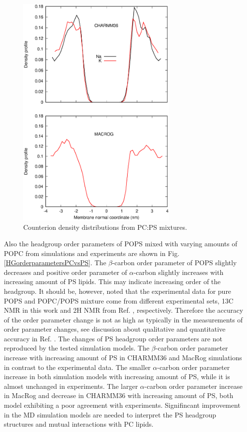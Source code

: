 \documentclass[aps,prl,superscriptaddress,twocolumn]{revtex4}
\begin{document}
\begin{figure}[]
  \centering
  \includegraphics[width=8.0cm]{../Figs/CIdensPSOCmixt.eps}
  \caption{  Counterion density distributions from PC:PS mixtures.
\label{CIdensPSOCmixt}
  }
\end{figure}

Also the headgroup order parameters of POPS mixed with varying amounts of POPC
from simulations and experiments \cite{borle85,roux90} are shown in Fig. \ref{HGorderparametersPCvsPS}.
The $\beta$-carbon order parameter of POPS slightly decreases and positive 
order parameter of $\alpha$-carbon slightly increases with increasing
amount of PS lipids. This may indicate increasing order of the headgroup.
It should be, however, noted that the experimental data for pure POPS and
POPC/POPS mixture come from different experimental sets, 13C NMR in this work
and 2H NMR from Ref. , respectively. Therefore the accuracy
of the order parameter change is not as high as typically in the measurements
of order parameter changes, see discussion about qualitative and quantitative 
accuracy in Ref. . The changes of PS headgroup order parameters
are not reproduced by the tested simulation models. The $\beta$-carbon order parameter
increase with increasing amount of PS in CHARMM36 and MacRog simulations in contrast
to the experimental data. The smaller $\alpha$-carbon order parameter increase in both
simulation models with increasing amount of PS, while it is almost unchanged in experiments.
The larger $\alpha$-carbon order parameter increase in MacRog and decrease in CHARMM36
with increasing amount of PS, both model exhibiting a poor agreement with experiments. 
Signifincant improvement in the MD simulation models are needed to interpret the
PS headgroup structures and mutual interactions with PC lipids. 
\end{document}
